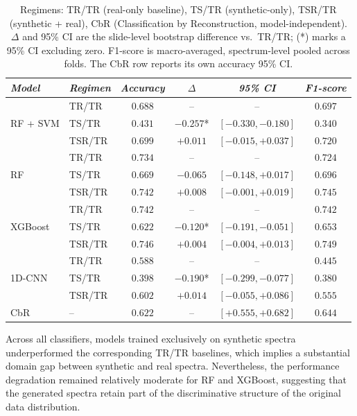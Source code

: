 \begin{table}[h] 
\caption{Binary Classification Results}
\label{tab:binary_results}
\small
\begin{tabular*}{\textwidth}{@{\extracolsep{\fill}}llcccc}
\toprule
\emph{Model} & \emph{Regimen} & \emph{Accuracy} & \emph{$\Delta$} & \emph{95\% CI} & \emph{F1-score}\\
\midrule
\multirow{3}{*}{RF + SVM} & TR/TR & $0.688$ & -- & -- & $0.697$ \\
 & TS/TR & $0.431$ & $-0.257$* & $[-0.330, -0.180]$ & $0.340$ \\
 & TSR/TR & $0.699$ & $+0.011$ & $[-0.015, +0.037]$ & $0.720$ \\
\midrule
\multirow{3}{*}{RF} & TR/TR & $0.734$ & -- & -- & $0.724$ \\
 & TS/TR & $0.669$ & $-0.065$ & $[-0.148, +0.017]$ & $0.696$ \\
 & TSR/TR & $0.742$ & $+0.008$ & $[-0.001, +0.019]$ & $0.745$ \\
\midrule
\multirow{3}{*}{XGBoost} & TR/TR & $0.742$ & -- & -- & $0.742$ \\
 & TS/TR & $0.622$ & $-0.120$* & $[-0.191, -0.051]$ & $0.653$ \\
 & TSR/TR & $0.746$ & $+0.004$ & $[-0.004, +0.013]$ & $0.749$ \\
\midrule
\multirow{3}{*}{1D-CNN} & TR/TR & $0.588$ & -- & -- & $0.445$ \\
 & TS/TR & $0.398$ & $-0.190$* & $[-0.299, -0.077]$ & $0.380$ \\
 & TSR/TR & $0.602$ & $+0.014$ & $[-0.055, +0.086]$ & $0.555$ \\
\midrule
CbR & -- & $0.622$ & -- & $[+0.555, +0.682]$ & $0.644$ \\
\bottomrule
\end{tabular*}
\caption{Regimens: TR/TR (real-only baseline), TS/TR (synthetic-only), TSR/TR (synthetic + real), CbR (Classification by Reconstruction, model-independent). $\Delta$ and 95\% CI are the slide-level bootstrap difference vs.\ TR/TR; (*) marks a 95\% CI excluding zero. F1-score is macro-averaged, spectrum-level pooled across folds. The CbR row reports its own accuracy 95\% CI.}
\end{table}

Across all classifiers, models trained exclusively on synthetic spectra underperformed the corresponding TR/TR baselines, which implies a substantial domain gap between synthetic and real spectra. Nevertheless, the performance degradation remained relatively moderate for RF and XGBoost, suggesting that the generated spectra retain part of the discriminative structure of the original data distribution.

